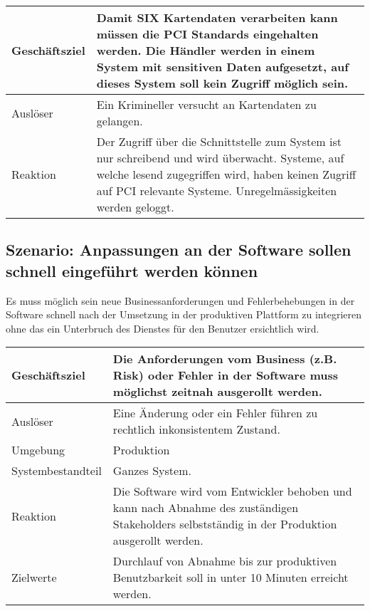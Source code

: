 \begin{table}[H]
	\centering
	\begin{tabular}{ | p{3cm} | p{12cm} | }
		\toprule
		Geschäftsziel & Damit SIX Kartendaten verarbeiten kann müssen die PCI Standards eingehalten werden. Die Händler werden in einem System mit sensitiven Daten aufgesetzt, auf dieses System soll kein Zugriff möglich sein. \\ \hline
		Auslöser & Ein Krimineller versucht an Kartendaten zu gelangen. \\ \hline
		Reaktion & Der Zugriff über die Schnittstelle zum System ist nur schreibend und wird überwacht. Systeme, auf welche lesend zugegriffen wird, haben keinen Zugriff auf PCI relevante Systeme. Unregelmässigkeiten werden geloggt. \\
		\bottomrule
	\end{tabular}
\end{table}

\subsection{Szenario: Anpassungen an der Software sollen schnell eingeführt werden können}

Es muss möglich sein neue Businessanforderungen und Fehlerbehebungen in der Software schnell nach der Umsetzung in der produktiven Plattform zu integrieren ohne das ein Unterbruch des Dienstes für den Benutzer ersichtlich wird.

\begin{table}[H]
	\centering
	\begin{tabular}{ | p{3cm} | p{12cm} | }
		\toprule
		Geschäftsziel & Die Anforderungen vom Business (z.B. Risk) oder Fehler in der Software muss möglichst zeitnah ausgerollt werden. \\ \hline
		Auslöser & Eine Änderung oder ein Fehler führen zu rechtlich inkonsistentem Zustand. \\ \hline
		Umgebung & Produktion\\ \hline
		Systembestandteil & Ganzes System. \\ \hline
		Reaktion & Die Software wird vom Entwickler behoben und kann nach Abnahme des zuständigen Stakeholders selbstständig in der Produktion ausgerollt werden. \\ \hline
		Zielwerte & Durchlauf von Abnahme bis zur produktiven Benutzbarkeit soll in unter 10 Minuten erreicht werden.\\
		\bottomrule
	\end{tabular}
\end{table}

